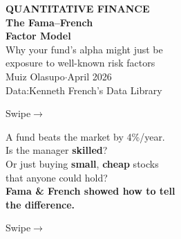 \documentclass{beamer}
\newcommand{\swipe}{%
  \vfill\hfill{\color{muted}\small Swipe\;$\rightarrow$}%
}
\begin{document}

\begin{frame}[plain,shrink=25]
  \vspace{2.5cm}
  \begin{center}
    {\fontsize{14}{18}\selectfont\color{accent}\bfseries
      QUANTITATIVE FINANCE}\\[0.6cm]
    {\fontsize{32}{36}\selectfont\bfseries\color{ink}%
      The Fama--French\\[0.15cm]
      Factor Model}\\[0.8cm]
    {\fontsize{15}{20}\selectfont\color{muted}%
      Why your fund's alpha might just be\\[0.08cm]
      exposure to well-known risk factors}\\[1.5cm]
    {\fontsize{12}{16}\selectfont\color{muted}%
      Muiz Olasupo\;\;$\cdot$\;\;April 2026}\\[0.15cm]
    {\fontsize{11}{14}\selectfont\color{muted}%
      Data:\;Kenneth French's Data Library}
  \end{center}
  \vfill
  \hfill{\color{muted}\small Swipe\;$\rightarrow$}
  \vspace{0.3cm}
\end{frame}

\begin{frame}[plain,shrink=25]
  \vspace{2.5cm}
  \begin{center}
    {\fontsize{18}{23}\selectfont\color{muted}%
      A fund beats the market by 4\%/year.}\\[0.7cm]
    {\fontsize{20}{25}\selectfont\color{ink}%
      Is the manager \textbf{skilled}?}\\[0.6cm]
    {\fontsize{20}{25}\selectfont\color{ink}%
      Or just buying \textbf{\color{accentorange}small},
      \textbf{\color{accentgreen}cheap} stocks\\[0.1cm]
      that anyone could hold?}\\[1.0cm]
    {\fontsize{16}{21}\selectfont\color{accent}\bfseries%
      Fama \& French showed how to tell\\[0.1cm]
      the difference.}
  \end{center}
  \vfill
  \swipe
  \vspace{0.3cm}
\end{frame}
\end{document}
